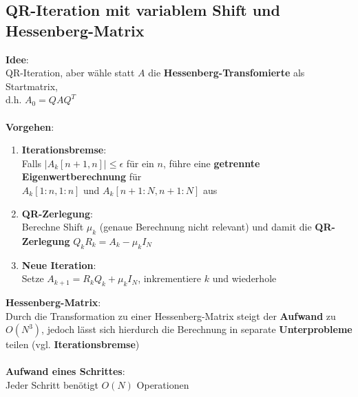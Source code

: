 \subsection{QR-Iteration mit variablem Shift und Hessenberg-Matrix}%
\label{ew:sub:qr-iteration-hessenberg}
\textbf{Idee}:\\QR-Iteration, aber wähle statt $A$ die \textbf{Hessenberg-Transfomierte} als Startmatrix,\\d.h. $A_0 = QAQ^T$\\\\
\textbf{Vorgehen}:
\begin{enumerate}
	\item \textbf{Iterationsbremse}:\\
	Falls $|A_k[n + 1, n]| \leq \epsilon$ für ein $n$, führe eine \textbf{getrennte Eigenwertberechnung} für\\$A_k[1 : n, 1 : n]$ und $A_k[n + 1 : N, n + 1 : N]$ aus
	\item \textbf{QR-Zerlegung}:\\
	Berechne Shift $\mu_k$ (genaue Berechnung nicht relevant) und damit die \textbf{QR-Zerlegung} $Q_kR_k = A_k - \mu_kI_N$
	\item \textbf{Neue Iteration}:\\
	Setze $A_{k+1} = R_kQ_k + \mu_kI_N$, inkrementiere $k$ und wiederhole
\end{enumerate}
\textbf{Hessenberg-Matrix}:\\Durch die Transformation zu einer Hessenberg-Matrix steigt der \textbf{Aufwand} zu $O(N^3)$, jedoch lässt sich hierdurch die Berechnung in separate \textbf{Unterprobleme} teilen (vgl. \textbf{Iterationsbremse})\\\\
\textbf{Aufwand eines Schrittes}:\\Jeder Schritt benötigt $O(N)$ Operationen